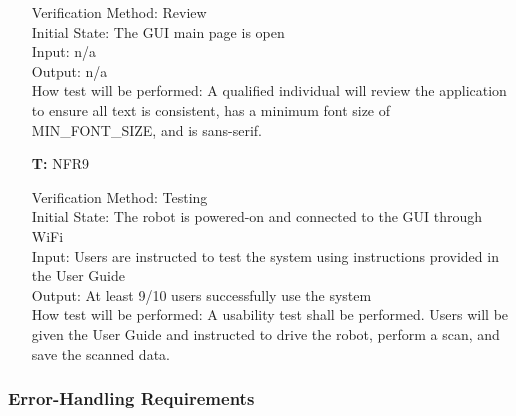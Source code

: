 \documentclass[12pt, titlepage]{article}
\newcounter{tnum} %
\begin{document}
\begin{itemize}
Verification Method: Review\\					
Initial State: The GUI main page is open\\			
Input: n/a\\
Output: n/a\\
How test will be performed: A qualified individual will review the application to ensure all text is consistent, has a minimum font size of MIN\_FONT\_SIZE, and is sans-serif. \\

\item[\textbf{T\refstepcounter{tnum}\thetnum:}]{NFR9\\}

Verification Method: Testing\\					
Initial State: The robot is powered-on and connected to the GUI through WiFi\\			
Input: Users are instructed to test the system using instructions provided in the User Guide\\
Output: At least 9/10 users successfully use the system\\
How test will be performed: A usability test shall be performed. Users will be given the User Guide and instructed to drive the robot, perform a scan, and save the scanned data.\\ 

\end{itemize}

\subsubsection{Error-Handling Requirements}
\end{document}
